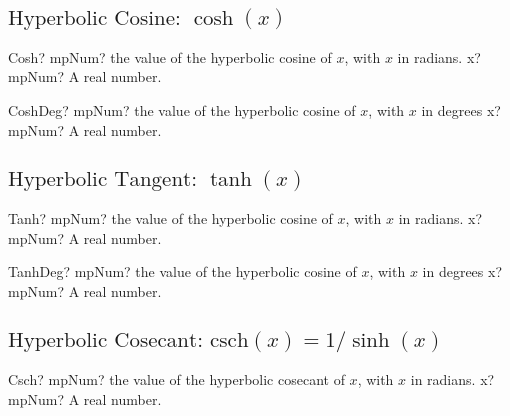 \subsection{\texorpdfstring{$\text{Hyperbolic Cosine: }\cosh(x)$}{cosh}}


\begin{mpFunctionsExtract}
	\mpFunctionOne
	{Cosh? mpNum? the value of the hyperbolic cosine of $x$, with $x$ in radians.}
	{x? mpNum? A real number.}
\end{mpFunctionsExtract}

\vspace{0.6cm}

\begin{mpFunctionsExtract}
	\mpFunctionOne
	{CoshDeg? mpNum? the value of the hyperbolic cosine of $x$, with $x$ in degrees}
	{x? mpNum? A real number.}
\end{mpFunctionsExtract}






\subsection{\texorpdfstring{$\text{Hyperbolic Tangent: }\tanh(x)$}{tanh}}

\begin{mpFunctionsExtract}
	\mpFunctionOne
	{Tanh? mpNum? the value of the hyperbolic cosine of $x$, with $x$ in radians.}
	{x? mpNum? A real number.}
\end{mpFunctionsExtract}

\vspace{0.6cm}

\begin{mpFunctionsExtract}
	\mpFunctionOne
	{TanhDeg? mpNum? the value of the hyperbolic cosine of $x$, with $x$ in degrees}
	{x? mpNum? A real number.}
\end{mpFunctionsExtract}






\subsection{\texorpdfstring{$\text{Hyperbolic Cosecant: csch}(x) = 1/\sinh(x)$}{csch}}

\begin{mpFunctionsExtract}
	\mpFunctionOne
	{Csch? mpNum? the value of the hyperbolic cosecant of $x$, with $x$ in radians.}
	{x? mpNum? A real number.}
\end{mpFunctionsExtract}

